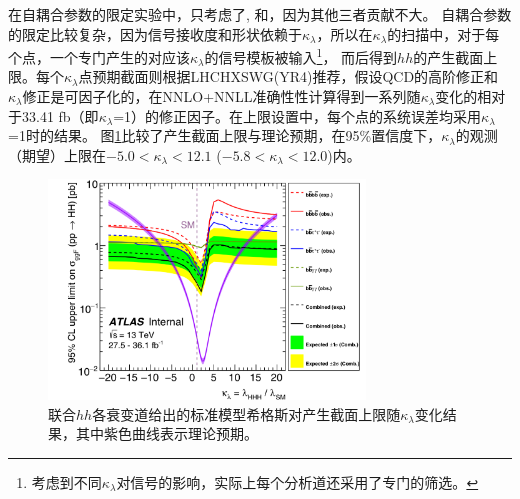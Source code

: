 在自耦合参数的限定实验中，只考虑了\bbbb , \bbtt 和\bbaa ，因为其他三者贡献不大。
自耦合参数的限定比较复杂，因为信号接收度和形状依赖于$\kappa_{\lambda}$，所以在$\kappa_{\lambda}$的扫描中，对于每个点，一个专门产生的对应该$\kappa_{\lambda}$的信号模板被输入\footnote{考虑到不同$\kappa_{\lambda}$对信号的影响，实际上每个分析道还采用了专门的筛选。}，
而后得到$hh$的产生截面上限。每个$\kappa_{\lambda}$点预期截面则根据LHCHXSWG(YR4)\cite{SM-HIGGS-BR}推荐，假设QCD的高阶修正和$\kappa_{\lambda}$修正是可因子化的，在NNLO+NNLL准确性性计算得到一系列随$\kappa_{\lambda}$变化的相对于33.41 fb（即$\kappa_{\lambda}$=1）的修正因子。在上限设置中，每个点的系统误差均采用$\kappa_{\lambda}$=1时的结果。
图\ref{fig:HH_selfcoupling}比较了产生截面上限与理论预期，在95\%置信度下，$\kappa_{\lambda}$的观测（期望）上限在$-5.0<\kappa_{\lambda}<12.1$ ($-5.8<\kappa_{\lambda}<12.0$)内。
\begin{figure}[h]
\centering
 \includegraphics[width=0.75\textwidth]{fig/HH_selfcoupling.png}
 \caption{联合$hh$各衰变道给出的标准模型希格斯对产生截面上限随$\kappa_{\lambda}$变化结果，其中紫色曲线表示理论预期。}
 \label{fig:HH_selfcoupling}
\end{figure}
